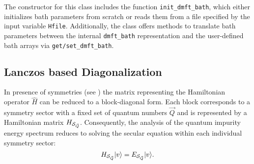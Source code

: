 \documentclass[edipack2.tex]{subfiles}
\begin{document}
The constructor for this class includes the function 
{\tt init\_dmft\_bath}, which either initializes bath parameters 
from scratch or reads them from a file specified by the input 
variable {\tt Hfile}. Additionally, the class offers methods to 
translate bath parameters between the internal {\tt dmft\_bath} 
representation and the user-defined bath arrays via 
{\tt get/set\_dmft\_bath}.











\subsection{Lanczos based Diagonalization}\label{sSecHam}
In presence of symmetries (see ) the matrix representing
the Hamiltonian operator $\hat{H}$ can be reduced to a block-diagonal form. Each block corresponds to a symmetry sector
with a fixed set of quantum numbers $\vec{Q}$ and is represented by
a Hamiltonian matrix $H_{{\cal S}_{\vec{Q}}}$. 
Consequently, the analysis of the quantum impurity energy spectrum reduces to solving
the secular equation within each individual symmetry sector:
$$
H_{{\cal S}_{\vec{Q}}}|v\rangle=E_{{\cal S}_{\vec{Q}}}|v\rangle.
$$
\end{document}
